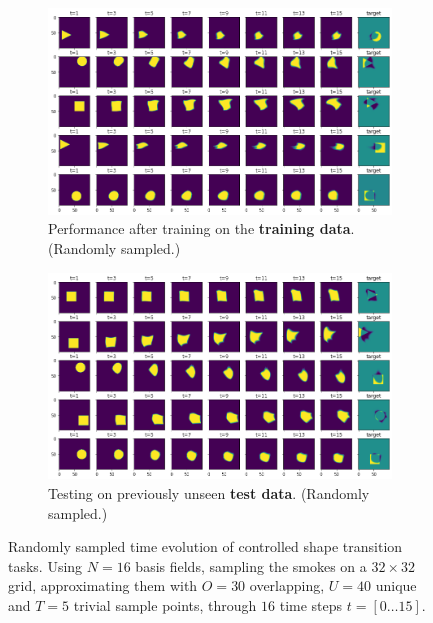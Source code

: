 \begin{figure}
  \centering
  \begin{subfigure}{\textwidth}
    \centering
    \includegraphics[width=\textwidth]{figures/nn-final/trained_trajectories_horizontal.png}
    \caption{Performance after training on the \textbf{training data}. (Randomly
    sampled.)}
    \label{fig:NN-shape-transition-train}
  \end{subfigure}
  \begin{subfigure}{\textwidth}
    \centering
    \includegraphics[width=\textwidth]{figures/nn-final/test_trajectories_horizontal.png}
    \caption{Testing on previously unseen \textbf{test data}. (Randomly
      sampled.)}
    \label{fig:NN-shape-transition-test}
  \end{subfigure}
  \caption{Randomly sampled time evolution of controlled shape transition
  tasks. Using $N=16$ basis fields, sampling the smokes on a $32\times 32$ grid,
  approximating them with $O=30$ overlapping, $U=40$ unique and $T=5$ trivial
  sample points, through $16$ time steps $t=[0\dots15]$.}
  \label{fig:NN-shape-transition}
\end{figure}
